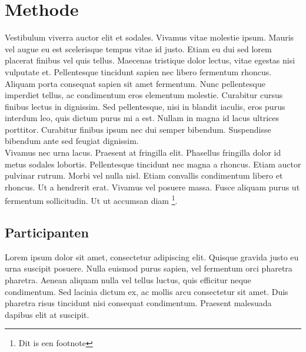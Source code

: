 \section{Methode}
Vestibulum viverra auctor elit et sodales. Vivamus vitae molestie ipsum. Mauris vel augue eu est scelerisque tempus vitae id justo. Etiam eu dui sed lorem placerat finibus vel quis tellus. Maecenas tristique dolor lectus, vitae egestas nisi vulputate et. Pellentesque tincidunt sapien nec libero fermentum rhoncus. Aliquam porta consequat sapien sit amet fermentum. Nunc pellentesque imperdiet tellus, ac condimentum eros elementum molestie.
Curabitur cursus finibus lectus in dignissim. Sed pellentesque, nisi in blandit iaculis, eros purus interdum leo, quis dictum purus mi a est. Nullam in magna id lacus ultrices porttitor. Curabitur finibus ipsum nec dui semper bibendum. Suspendisse bibendum ante sed feugiat dignissim. \\

\noindent Vivamus nec urna lacus. Praesent at fringilla elit. Phasellus fringilla dolor id metus sodales lobortis. Pellentesque tincidunt nec magna a rhoncus. Etiam auctor pulvinar rutrum. Morbi vel nulla nisl. Etiam convallis condimentum libero et rhoncus. Ut a hendrerit erat. Vivamus vel posuere massa. Fusce aliquam purus ut fermentum sollicitudin. Ut ut accumsan diam \footnote{Dit is een footnote}. %

\subsection{Participanten}
Lorem ipsum dolor sit amet, consectetur adipiscing elit. Quisque gravida justo eu urna suscipit posuere. Nulla euismod purus sapien, vel fermentum orci pharetra pharetra. Aenean aliquam nulla vel tellus luctus, quis efficitur neque condimentum. Sed lacinia dictum ex, ac mollis arcu consectetur sit amet. Duis pharetra risus tincidunt nisi consequat condimentum. Praesent malesuada dapibus elit at suscipit.

